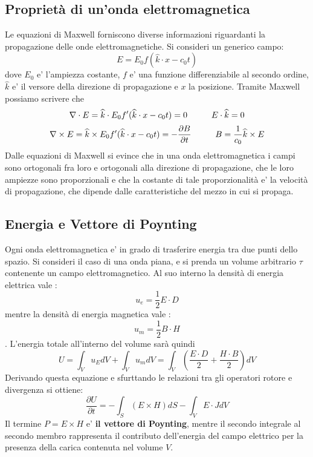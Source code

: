 \documentclass[a4paper, 10pt]{article}
\begin{document}
		\subsection{Proprietà di un'onda elettromagnetica}
			Le equazioni di Maxwell forniscono diverse informazioni riguardanti la propagazione delle onde elettromagnetiche. 
			Si consideri un generico campo:
			\[ E = E_0 f (\widehat{k} \cdot x - c_0 t)\] dove $E_0$ e' l'ampiezza costante, $f$ e' una funzione differenziabile al
			secondo ordine, $\widehat{k}$ e' il versore della direzione di propagazione e $x$ la posizione. 
			Tramite Maxwell possiamo scrivere che 
			\[ \nabla \cdot E = \widehat{k} \cdot E_0 f' (\widehat{k} \cdot x - c_0 t) = 0 \hspace{1.0cm} E \cdot\widehat{k} = 0\]
			\[ \nabla \times E = \widehat{k} \times E_0 f' (\widehat{k} \cdot x - c_0 t) = -\frac{\partial B}{\partial t}
			\hspace{1.0cm} B = \frac{1}{c_0}\widehat{k} \times E\]
			Dalle equazioni di Maxwell si evince che in una onda elettromagnetica i campi sono ortogonali fra loro e ortogonali 
			alla direzione di propagazione, che le loro ampiezze sono proporzionali e che la costante di tale proporzionalità e'
			la velocità di propagazione, che dipende dalle caratteristiche del mezzo in cui si propaga.
		\subsection{Energia e Vettore di Poynting}
			Ogni onda elettromagnetica e' in grado di trasferire energia tra due punti dello spazio. Si consideri il caso di una
			onda piana, e si prenda un volume arbitrario $\tau$ contenente un campo elettromagnetico. Al suo interno la densità
			di energia elettrica vale :
			\[ u_e = \frac{1}{2} E \cdot D \] mentre la densità di energia magnetica vale : \[u_m = \frac{1}{2} B \cdot H \].
			L'energia totale all'interno del volume sarà quindi 
			\[ U = \int_V u_E dV + \int_V u_m dV = \int_V (\frac{E \cdot D}{2} + \frac{H \cdot B}{2}) dV \]
			Derivando questa equazione e sfurttando le relazioni tra gli operatori rotore e divergenza si ottiene:
			\[ \frac{\partial U}{\partial t} = - \int_S (E \times H) dS - \int_V E \cdot J dV \] Il termine $P = E \times H$ e' 
			\textbf{il vettore di Poynting}, mentre il secondo integrale al secondo membro rappresenta il contributo dell'energia
			del campo elettrico per la presenza della carica contenuta nel volume $V$.

		
\end{document}
